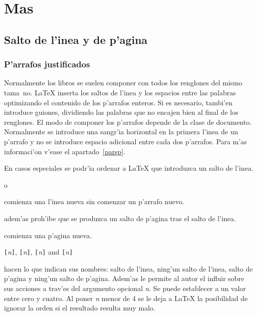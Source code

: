 \chapter{Mas}



\section{Salto de l'inea y de p'agina}

\subsection{P'arrafos justificados}

Normalmente los libros se suelen componer con todos los renglones del
mismo tama~no. \LaTeX{} inserta los saltos de l'inea y los espacios
entre las palabras optimizando el contenido de los p'arrafos enteros.
Si es necesario, tambi'en introduce guiones, dividiendo las palabras
que no encajen bien al final de los renglones. El modo de componer los
p'arrafos depende de la clase de documento. Normalmente se introduce
una sangr'ia horizontal en la primera l'inea de un p'arrafo y no se
introduce espacio adicional entre cada dos p'arrafos. Para m'as
informaci'on v'ease el apartado~\ref{parsp}.

En casos especiales se podr'ia ordenar a \LaTeX{} que introduzca un
salto de l'inea.

\begin{command}
\ci{\bs} o 
\end{command}
\noindent comienza una l'inea nueva sin comenzar un p'arrafo nuevo.

\begin{command}
\ci{\bs*}
\end{command}
\noindent adem'as proh'ibe que se produzca un salto de p'agina tras el
salto de l'inea.

\begin{command}
\end{command}
\noindent comienza una p'agina nueva.
\pagebreak

\begin{command}
\verb|[|\emph{n}\verb|]|,
\verb|[|\emph{n}\verb|]|,
\verb|[|\emph{n}\verb|]| and
\verb|[|\emph{n}\verb|]|
\end{command}
\noindent hacen lo que indican sus nombres: salto de l'inea,
ning'un salto de l'inea, salto de p'agina y ning'un salto de
p'agina. Adem'as le permite al autor el influir sobre sus acciones
a trav'es del argumento opcional \emph{n}. Se puede establecer a
un valor entre cero y cuatro. Al poner \emph{n} menor de 4 se le
deja a \LaTeX{} la posibilidad de ignorar la orden si el resultado
resulta muy malo.

